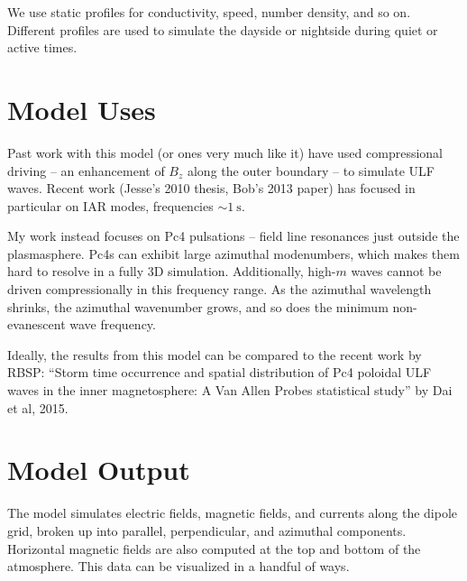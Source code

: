 \documentclass{article}
\begin{document}
We use static profiles for conductivity, \Alfven speed, number density, and so on. Different profiles are used to simulate the dayside or nightside during quiet or active times. 

\section{Model Uses}

Past work with this model (or ones very much like it) have used compressional driving -- an enhancement of $B_z$ along the outer boundary -- to simulate ULF waves. Recent work (Jesse's 2010 thesis, Bob's 2013 paper) has focused in particular on IAR modes, frequencies $\sim \SI{1}{\s}$. 

My work instead focuses on Pc4 pulsations -- field line resonances just outside the plasmasphere. Pc4s can exhibit large azimuthal modenumbers, which makes them hard to resolve in a fully 3D simulation. Additionally, high-$m$ \Alfven waves cannot be driven compressionally in this frequency range. As the azimuthal wavelength shrinks, the azimuthal wavenumber grows, and so does the minimum non-evanescent \Alfven wave frequency. 

Ideally, the results from this model can be compared to the recent work by RBSP: ``Storm time occurrence and spatial distribution of Pc4 poloidal ULF waves in the inner magnetosphere: A Van Allen Probes statistical study'' by Dai et al, 2015. 

\section{Model Output}

The model simulates electric fields, magnetic fields, and currents along the dipole grid, broken up into parallel, perpendicular, and azimuthal components. Horizontal magnetic fields are also computed at the top and bottom of the atmosphere. This data can be visualized in a handful of ways. 

\end{document}
